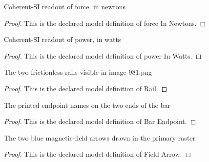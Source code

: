 \begin{definition}
  \label{def:physics:phyx-mini-0981:phyxminiproblems-problemphyxmini0981-forceinnewtons}
  Coherent-SI readout of force, in newtons
\end{definition}
\begin{proof}
  This is the declared model definition of force In Newtons.
\end{proof}
\begin{definition}
  \label{def:physics:phyx-mini-0981:phyxminiproblems-problemphyxmini0981-powerinwatts}
  Coherent-SI readout of power, in watts
\end{definition}
\begin{proof}
  This is the declared model definition of power In Watts.
\end{proof}
\begin{definition}[Rail]
  \label{def:physics:phyx-mini-0981:phyxminiproblems-problemphyxmini0981-rail}
  The two frictionless rails visible in image 981.png
\end{definition}
\begin{proof}
  This is the declared model definition of Rail.
\end{proof}
\begin{definition}
  \label{def:physics:phyx-mini-0981:phyxminiproblems-problemphyxmini0981-barendpoint}
  The printed endpoint names on the two ends of the bar
\end{definition}
\begin{proof}
  This is the declared model definition of Bar Endpoint.
\end{proof}
\begin{definition}
  \label{def:physics:phyx-mini-0981:phyxminiproblems-problemphyxmini0981-fieldarrow}
  The two blue magnetic-field arrows drawn in the primary raster
\end{definition}
\begin{proof}
  This is the declared model definition of Field Arrow.
\end{proof}

